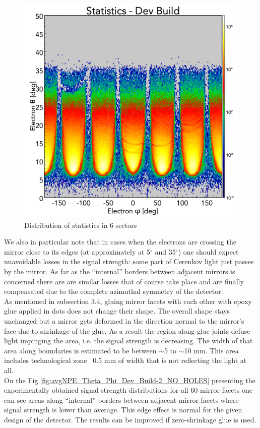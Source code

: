 \begin{figure}[!h]
    \centering
    \includegraphics[width=1.0\linewidth,trim={0.0cm 0.0cm 0.0cm 1.67cm},clip]{images/statistics_Theta_Phi_Dev_Build_NO_HOLES.png}
    \caption{Distribution of statistics in 6 sectors}
    \label{fig:statistics_Theta_Phi_Dev_Build_NO_HOLES}
\end{figure}
We also in particular note that in cases when the electrons are crossing the mirror close to its edges (at approximately at
5$^\circ$ and 35$^\circ$) one should expect unavoidable losses in the signal strength: some part of Cerenkov light just passes by the mirror. As far as the “internal” borders between adjacent mirrors is concerned there are are similar losses that of course take place and are finally compensated due to the complete azimuthal symmetry of the detector.\\
\indent As mentioned in subsection 3.4, gluing mirror facets with each other with epoxy glue applied in dots does not change their shape. The overall shape stays unchanged but a mirror gets deformed in the direction normal to the mirror’s face due to shrinkage of the glue. As a result the region along glue joints defuse light impinging the area, i.e. the signal strength is decreasing. The width of that area along boundaries is estimated to be between $\sim$5 to $\sim$10 mm. This area includes technological zone ~0.5 mm of width that is not reflecting the light at all.\\
\indent On the Fig.\ref{fig:avgNPE_Theta_Phi_Dev_Build-2_NO_HOLES} presenting the experimentally obtained signal strength distributions for all 60 mirror facets one can see areas along “internal” borders between adjacent mirror facets where signal strength is lower than average. This edge effect is normal for the given design of the detector. The results can be improved if zero-shrinkage glue is used. 
